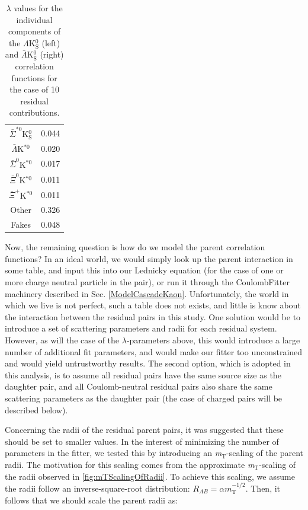 \documentclass[../AnalysisNoteJBuxton.tex]{subfiles}
\begin{document}
\begin{table}[htbp]
\begin{minipage}{0.3\textwidth}
\begin{tabular}{|c|c|}
   $\bar{\Sigma}^{*0}$K$^{0}_{\mathrm{S}}$ & 0.044 \\
   $\bar{\Lambda}$K$^{*0}$ & 0.020 \\
   $\bar{\Sigma}^{0}$K$^{*0}$ & 0.017 \\
   $\bar{\Xi}^{0}$K$^{*0}$ & 0.011 \\
   $\bar{\Xi}^{+}$K$^{*0}$ & 0.011 \\
   Other & 0.326 \\
   Fakes & 0.048 \\
   \hline
  \end{tabular}
 \end{minipage} 
 \caption{$\lambda$ values for the individual components of the $\Lambda$K$^{0}_{\mathrm{S}}$ (left) and $\bar{\Lambda}$K$^{0}_{\mathrm{S}}$ (right) correlation functions for the case of 10 residual contributions.}
 \label{tab:LambdaValues_10Res_LamK0}
\end{table}



Now, the remaining question is how do we model the parent correlation functions?  In an ideal world, we would simply look up the parent interaction in some table, and input this into our Lednicky equation (for the case of one or more charge neutral particle in the pair), or run it through the CoulombFitter machinery described in Sec. \ref{ModelCascadeKaon}.  Unfortunately, the world in which we live is not perfect, such a table does not exists, and little is know about the interaction between the residual pairs in this study.  One solution would be to introduce a set of scattering parameters and radii for each residual system.  However, as will the case of the $\lambda$-parameters above, this would introduce a large number of additional fit parameters, and would make our fitter too unconstrained and would yield untrustworthy results.  The second option, which is adopted in this analysis, is to assume all residual pairs have the same source size as the daughter pair, and all Coulomb-neutral residual pairs also share the same scattering parameters as the daughter pair (the case of charged pairs will be described below).

Concerning the radii of the residual parent pairs, it was suggested that these should be set to smaller values.  In the interest of minimizing the number of parameters in the fitter, we tested this by introducing an \textit{m}$_{\mathrm{T}}$-scaling of the parent radii.  The motivation for this scaling comes from the approximate \textit{m}$_{\mathrm{T}}$-scaling of the radii observed in \ref{fig:mTScalingOfRadii}.  To achieve this scaling, we assume the radii follow an inverse-square-root distribution: $R_{AB} = \alpha m_{\mathrm{T}}^{-1/2}$.  Then, it follows that we should scale the parent radii as:
\end{document}
